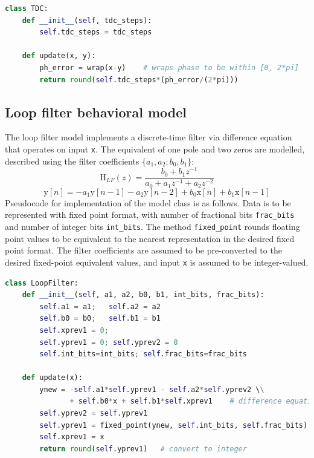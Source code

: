 \begin{lstlisting}[language={Python}, caption={TDC behavioral model.}, label={tdc_code}]
class TDC:
	def __init__(self, tdc_steps):
		self.tdc_steps = tdc_steps

	def update(x, y):
		ph_error = wrap(x-y) 	# wraps phase to be within [0, 2*pi]
		return round(self.tdc_steps*(ph_error/(2*pi)))
\end{lstlisting}
\subsection{Loop filter behavioral model}
The loop filter model implements a discrete-time filter via difference equation that operates on input \texttt{x}. The equivalent of one pole and two zeros are modelled, described using the filter coefficients $\{a_1, a_2; b_0, b_1\}$:
\begin{equation}
\text{H}_{LF}(z) = \frac{b_0 + b_1z^{-1}}{a_0 + a_1z^{-1} + a_2z^{-2}}
\end{equation}
\begin{equation}
\text{y}[n] = -a_1 \text{y}[n-1]-a_2 \text{y}[n-2] + b_0\text{x}[n] + b_1\text{x}[n-1]
\end{equation}
Pseudocode for implementation of the model class is as follows. Data is to be represented with fixed point format, with number of fractional bits \texttt{frac\_bits} and number of integer bits \texttt{int\_bits}. The method \texttt{fixed\_point} rounds floating point values to be equivalent to the nearest representation in the desired fixed point format. The filter coefficients are assumed to be pre-converted to the desired fixed-point equivalent values, and input \texttt{x} is assumed to be integer-valued.
\begin{lstlisting}[language={Python}, caption={Loop filter behavioral model.}, label={lf_code}]
class LoopFilter:
	def __init__(self, a1, a2, b0, b1, int_bits, frac_bits):
		self.a1 = a1;	self.a2 = a2
		self.b0 = b0;	self.b1 = b1
		self.xprev1 = 0;	
		self.yprev1 = 0; self.yprev2 = 0
		self.int_bits=int_bits;	self.frac_bits=frac_bits

	def update(x):
		ynew = -self.a1*self.yprev1 - self.a2*self.yprev2 \\
			   + self.b0*x + self.b1*self.xprev1	# difference equation
		self.yprev2 = self.yprev1	
		self.yprev1 = fixed_point(ynew, self.int_bits, self.frac_bits)
		self.xprev1 = x
		return round(self.yprev1)	# convert to integer
\end{lstlisting}

